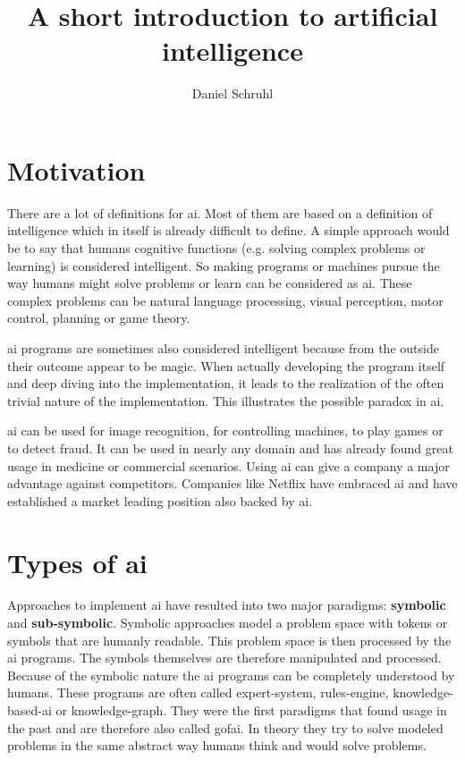 \documentclass[jou,apacite]{apa6}
\title{A short introduction to artificial intelligence}
\author{Daniel Schruhl}
\affiliation{ThoughtWorks}
\begin{document}
\maketitle    
                        
\section{Motivation}
There are a lot of definitions for \gls{ai}. Most of them are based on a definition of intelligence which in itself is already difficult to define. A simple approach would be to say that humans cognitive functions (e.g. solving complex problems or learning) is considered intelligent. So making programs or machines pursue the way humans might solve problems or learn can be considered as \gls{ai}. These complex problems can be natural language processing, visual perception, motor control, planning or game theory.

\gls{ai} programs are sometimes also considered intelligent because from the outside their outcome appear to be magic. When actually developing the program itself and deep diving into the implementation, it leads to the realization of the often trivial nature of the implementation. This illustrates the possible paradox in \gls{ai}.

\gls{ai} can be used for image recognition, for controlling machines, to play games or to detect fraud. It can be used in nearly any domain and has already found great usage in medicine or commercial scenarios. Using \gls{ai} can give a company a major advantage against competitors. Companies like Netflix have embraced \gls{ai} \cite{Gomez-Uribe2015} and have established a market leading position also backed by \gls{ai}.

\section{Types of \gls{ai}}
Approaches to implement \gls{ai} have resulted into two major paradigms: \textbf{symbolic} and \textbf{sub-symbolic}. Symbolic approaches model a problem space with tokens or symbols that are humanly readable. This problem space is then processed by the \gls{ai} programs. The symbols themselves are therefore manipulated and processed. Because of the symbolic nature the \gls{ai} programs can be completely understood by humans. These programs are often called \gls{expert-system}, \gls{rules-engine}, \gls{knowledge-based-ai} or \gls{knowledge-graph}. They were the first paradigms that found usage in the past and are therefore also called \gls{gofai}. In theory they try to solve modeled problems in the same abstract way humans think and would solve problems.
\end{document}
